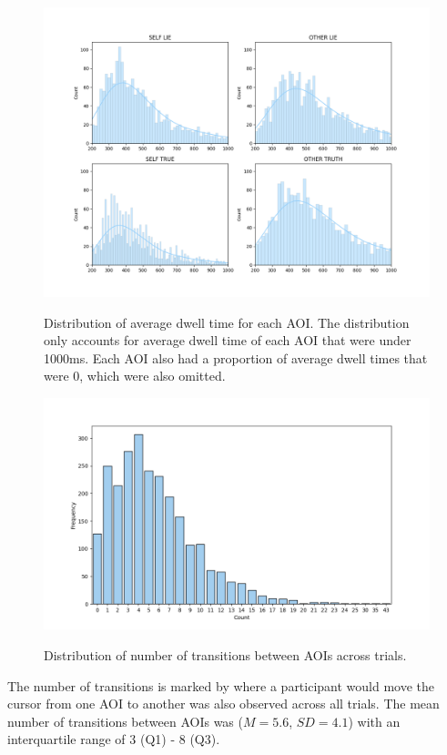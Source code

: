 \documentclass[man, floatsintext]{apa7}
\begin{document}
\begin{figure}[H]
	\centering
	\caption{Distribution of average dwell time for each AOI. The distribution only accounts for average dwell time of each AOI that were under 1000ms. Each AOI also had a proportion of average dwell times that were 0, which were also omitted.}
	\includegraphics[width=\linewidth]{../plots/Dwell/DwellDistPlot.png}
	\label{fig:DwellDistPlot}
\end{figure}

\begin{figure}[H]
	\centering
	\caption{Distribution of number of transitions between AOIs across trials.}
	\includegraphics[width=0.65\linewidth]{../plots/Dwell/N_TransitionsDistPlot.png}
	\label{fig:NTransitionsDistPlot}
\end{figure}

The number of transitions is marked by where a participant would move the cursor from one AOI to another was also observed across all trials. The mean number of transitions between AOIs was ($M = 5.6$, $SD = 4.1$) with an interquartile range of 3 (Q1) - 8 (Q3).
\end{document}
